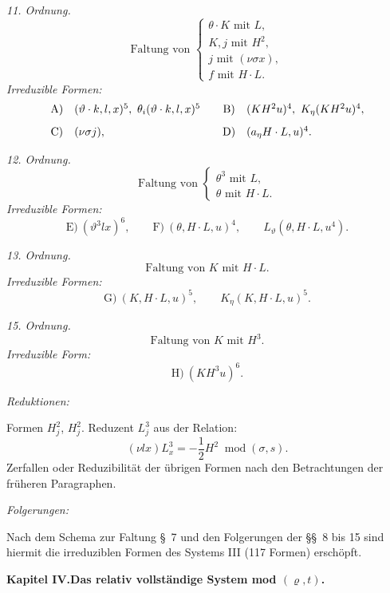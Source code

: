 \documentclass[11pt]{article}
\newcommand{\modu}[1]{\;\operatorname{mod} #1}
\begin{document}
\noindent\emph{11. Ordnung.}
\[
\text{Faltung von }\left\{\begin{array}{l}
\theta\cdot K\text{ mit }L,\\
K,j\text{ mit }H^2,\\
j\text{ mit }(\nu\sigma x),\\
f\text{ mit }H\cdot L.
\end{array}\right.
\]
\noindent\emph{Irreduzible Formen:}
\[
\begin{array}{c@{\quad}l@{\qquad}c@{\quad}l}
\text{A)}&(\vartheta\cdot k,l,x)^5,
\ \theta_i(\vartheta\cdot k,l,x)^5&
\text{B)}&(KH^2u)^4,
\ K_\eta(KH^2u)^4,\\[0.8em]
\text{C)}&(\nu\sigma j),&
\text{D)}&(a_\eta H\cdot L,u)^4.
\end{array}
\]

\noindent\emph{12. Ordnung.}
\[
\text{Faltung von }\left\{\begin{array}{l}
\theta^3\text{ mit }L,\\
\theta\text{ mit }H\cdot L.
\end{array}\right.
\]
\noindent\emph{Irreduzible Formen:}
\[
\text{E)}\ (\vartheta^3lx)^6,
\qquad
\text{F)}\ (\theta,H\cdot L,u)^4,
\qquad L_\vartheta(\theta,H\cdot L,u^4).
\]

\noindent\emph{13. Ordnung.}
\[
\text{Faltung von }K\text{ mit }H\cdot L.
\]
\noindent\emph{Irreduzible Formen:}
\[
\text{G)}\ (K,H\cdot L,u)^5,
\qquad K_\eta(K,H\cdot L,u)^5.
\]

\noindent\emph{15. Ordnung.}
\[
\text{Faltung von }K\text{ mit }H^3.
\]
\noindent\emph{Irreduzible Form:}
\[
\text{H)}\ (KH^3u)^6.
\]

\noindent\emph{Reduktionen:}

Formen $H_j^2$, $H_j^2$. Reduzent $L_j^3$ aus der Relation:
\[
(\nu lx)L_x^3=-\frac12H^2\modu{(\sigma,s)}.
\]
Zerfallen oder Reduzibilität der übrigen Formen nach den Betrachtungen der früheren Paragraphen.

\noindent\emph{Folgerungen:}

Nach dem Schema zur Faltung \S\ 7 und den Folgerungen der \S\S\ 8 bis 15 sind hiermit die irreduziblen Formen des Systems III (117 Formen) erschöpft.



\clearpage

\begin{center}
{\Large\bfseries Kapitel IV.\quad Das relativ vollständige System mod $(\varrho,t)$.}
\end{center}
\end{document}
